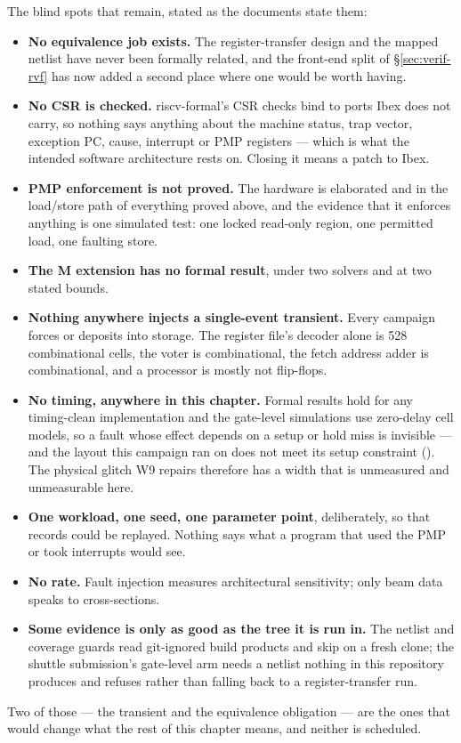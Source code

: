 The blind spots that remain, stated as the documents state them:

\begin{itemize}
\item \textbf{No equivalence job exists.} The register-transfer design
and the mapped netlist have never been formally related, and the
front-end split of \S\ref{sec:verif-rvf} has now added a second place
where one would be worth having.
\item \textbf{No CSR is checked.} riscv-formal's CSR checks bind to ports
Ibex does not carry, so nothing says anything about the machine status,
trap vector, exception PC, cause, interrupt or PMP registers --- which is
what the intended software architecture rests on. Closing it means a
patch to Ibex.
\item \textbf{PMP enforcement is not proved.} The hardware is elaborated
and in the load/store path of everything proved above, and the evidence
that it enforces anything is one simulated test: one locked read-only
region, one permitted load, one faulting store.
\item \textbf{The M extension has no formal result}, under two solvers
and at two stated bounds.
\item \textbf{Nothing anywhere injects a single-event transient.} Every
campaign forces or deposits into storage. The register file's decoder
alone is 528 combinational cells, the voter is combinational, the fetch
address adder is combinational, and a processor is mostly not flip-flops.
\item \textbf{No timing, anywhere in this chapter.} Formal results hold
for any timing-clean implementation and the gate-level simulations use
zero-delay cell models, so a fault whose effect depends on a setup or
hold miss is invisible --- and the layout this campaign ran on does not
meet its setup constraint (). The physical glitch W9
repairs therefore has a width that is unmeasured and unmeasurable here.
\item \textbf{One workload, one seed, one parameter point}, deliberately,
so that records could be replayed. Nothing says what a program that used
the PMP or took interrupts would see.
\item \textbf{No rate.} Fault injection measures architectural
sensitivity; only beam data speaks to cross-sections.
\item \textbf{Some evidence is only as good as the tree it is run in.}
The netlist and coverage guards read git-ignored build products and skip
on a fresh clone; the shuttle submission's gate-level arm needs a netlist
nothing in this repository produces and refuses rather than falling back
to a register-transfer run.
\end{itemize}

Two of those --- the transient and the equivalence obligation --- are the
ones that would change what the rest of this chapter means, and neither
is scheduled.
